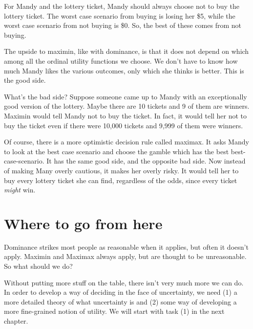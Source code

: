 For Mandy and the lottery ticket, Mandy should always choose not to buy the lottery ticket. The worst case scenario from buying is losing her \$5, while the worst case scenario from not buying is \$0.  So, the best of these comes from not buying.

The upside to maximin, like with dominance, is that it does not depend on which among all the ordinal utility functions we choose. We don't have to know how much Mandy likes the various outcomes, only which she thinks is better. This is the good side.

What's the bad side?  Suppose someone came up to Mandy with an exceptionally good version of the lottery.  Maybe there are 10 tickets and 9 of them are winners.  Maximin would tell Mandy not to buy the ticket.  In fact, it would tell her not to buy the ticket even if there were 10,000 tickets and 9,999 of them were winners.  

Of course, there is a more optimistic decision rule called maximax. It asks Mandy to look at the best case scenario and choose the gamble which has the best best-case-scenario.  It has the same good side, and the opposite bad side.  Now instead of making Many overly cautious, it makes her overly risky.  It would tell her to buy every lottery ticket she can find, regardless of the odds, since every ticket {\it might} win.

\section{Where to go from here}

Dominance strikes most people as reasonable when it applies, but often it doesn't apply.  Maximin and Maximax always apply, but are thought to be unreasonable.  So what should we do?  

Without putting more stuff on the table, there isn't very much more we can do.  In order to develop a way of deciding in the face of uncertainty, we need (1) a more detailed theory of what uncertainty is and (2) some way of developing a more fine-grained notion of utility.  We will start with task (1) in the next chapter.